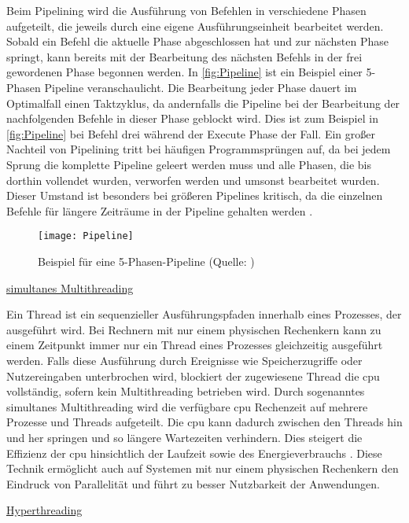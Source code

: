 Beim Pipelining wird die Ausführung von Befehlen in verschiedene Phasen aufgeteilt, die jeweils durch eine eigene Ausführungseinheit bearbeitet werden. Sobald ein Befehl die aktuelle Phase abgeschlossen hat und zur nächsten Phase springt, kann bereits mit der Bearbeitung des nächsten Befehls in der frei gewordenen Phase begonnen werden. In \autoref{fig:Pipeline} ist ein Beispiel einer 5-Phasen Pipeline veranschaulicht. Die Bearbeitung jeder Phase dauert im Optimalfall einen Taktzyklus, da andernfalls die Pipeline bei der Bearbeitung der nachfolgenden Befehle in dieser Phase geblockt wird. Dies ist zum Beispiel in \autoref{fig:Pipeline} bei Befehl drei während der Execute Phase der Fall. Ein großer Nachteil von Pipelining tritt bei häufigen Programmsprüngen auf, da bei jedem Sprung die komplette Pipeline geleert werden muss und alle Phasen, die bis dorthin vollendet wurden, verworfen werden und umsonst bearbeitet wurden. Dieser Umstand ist besonders bei größeren Pipelines kritisch, da die einzelnen Befehle für längere Zeiträume in der Pipeline gehalten werden \cite{pipelineElektro}.
\begin{figure}[H]
	\begin{center}	 
	\texttt{[image: Pipeline]}
	\caption{Beispiel für eine 5-Phasen-Pipeline (Quelle: \cite{pipelineElektro})}
	\label{fig:Pipeline} 
	\end{center}
\end{figure}

\underline{simultanes Multithreading}

Ein Thread ist ein sequenzieller Ausführungspfaden innerhalb eines Prozesses, der ausgeführt wird. Bei Rechnern mit nur einem physischen Rechenkern kann zu einem Zeitpunkt immer nur ein Thread eines Prozesses gleichzeitig ausgeführt werden. Falls diese Ausführung durch Ereignisse wie Speicherzugriffe oder Nutzereingaben unterbrochen wird, blockiert der zugewiesene Thread die \ac{cpu} vollständig, sofern kein Multithreading betrieben wird. Durch sogenanntes simultanes Multithreading wird die verfügbare \ac{cpu} Rechenzeit auf mehrere Prozesse und Threads aufgeteilt. Die \ac{cpu} kann dadurch zwischen den Threads hin und her springen und so längere Wartezeiten verhindern. Dies steigert die Effizienz der \ac{cpu} hinsichtlich der Laufzeit sowie des Energieverbrauchs \cite[877]{cplusplus}. Diese Technik ermöglicht auch auf Systemen mit nur einem physischen Rechenkern den Eindruck von Parallelität und führt zu besser Nutzbarkeit der Anwendungen.

\underline{Hyperthreading}

